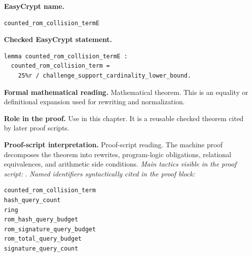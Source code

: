 \begin{formaltheorem}
\noindent\textbf{EasyCrypt name.}
\begin{lstlisting}[language=EasyCrypt,basicstyle=\ttfamily\scriptsize]
counted_rom_collision_termE
\end{lstlisting}
\noindent\textbf{Checked EasyCrypt statement.}
\begin{lstlisting}[language=EasyCrypt,basicstyle=\ttfamily\scriptsize]
lemma counted_rom_collision_termE :
  counted_rom_collision_term =
    25%r / challenge_support_cardinality_lower_bound.
\end{lstlisting}
\noindent\textbf{Formal mathematical reading.}
Mathematical theorem. This is an equality or definitional expansion used for rewriting and normalization.

\noindent\textbf{Role in the proof.}
Use in this chapter. It is a reusable checked theorem cited by later proof scripts.

\noindent\textbf{Proof-script interpretation.}
Proof-script reading. The machine proof decomposes the theorem into rewrites, program-logic obligations, relational equivalences, and arithmetic side conditions.
\emph{Main tactics visible in the proof script:} .
\emph{Named identifiers syntactically cited in the proof block:}
\begin{lstlisting}[language=EasyCrypt,basicstyle=\ttfamily\scriptsize]
counted_rom_collision_term
hash_query_count
ring
rom_hash_query_budget
rom_signature_query_budget
rom_total_query_budget
signature_query_count
\end{lstlisting}

\end{formaltheorem}

